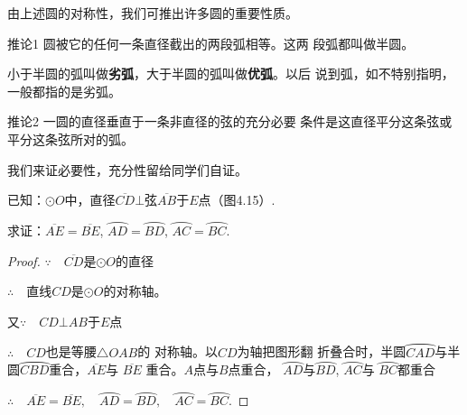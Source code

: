 \begin{figure}[htp]\centering
    \begin{minipage}[t]{0.48\textwidth}
    \centering
    \caption{}
    \end{minipage}
    \begin{minipage}[t]{0.48\textwidth}
    \centering
    \caption{}
    \end{minipage}
    \end{figure}

由上述圆的对称性，我们可推出许多圆的重要性质。

\begin{blk}
    {推论1} 圆被它的任何一条直径截出的两段弧相等。这两
段弧都叫做半圆。
\end{blk}

小于半圆的弧叫做\textbf{劣弧}，大于半圆的弧叫做\textbf{优弧}。以后
说到弧，如不特别指明，一般都指的是劣弧。

\begin{blk}
    {推论2} 一圆的直径垂直于一条非直径的弦的充分必要
条件是这直径平分这条弦或平分这条弦所对的弧。
\end{blk}

我们来证必要性，充分性留给同学们自证。

已知：$\odot O$中，直径$\overline{CD}\bot $弦$\overline{AB}$于$E$点（图4.15）.

求证：$\overline{AE}=\overline{BE}$, $\wideparen{AD}=\wideparen{BD}$, $\wideparen{AC}=\wideparen{BC}$.

\begin{proof}
$\because\quad \overline{CD}$是$\odot O$的直径

$\therefore\quad $直线$CD$是$\odot O$的对称轴。

又$\because\quad CD\bot AB$于$E$点

$\therefore\quad CD$也是等腰$\triangle OAB$的
对称轴。以$CD$为轴把图形翻
折叠合时，半圆$\wideparen{CAD}$与半圆$\wideparen{CBD}$重合，$\overline{AE}$与
$\overline{BE}$
重合。$A$点与$B$点重合，
$\wideparen{AD}$与$\wideparen{BD}$, $\wideparen{AC}$与
$\wideparen{BC}$都重合

$\therefore\quad \overline{AE}=\overline{BE},\quad 
\wideparen{AD}=\wideparen{BD},\quad 
\wideparen{AC}=\wideparen{BC}$.
\end{proof}

